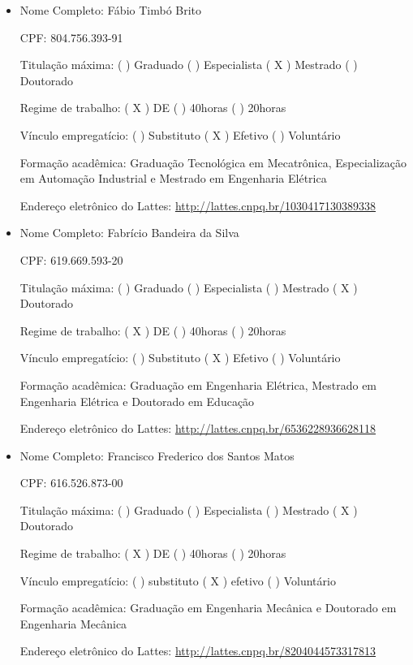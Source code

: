 \documentclass{paper}
\def\web#1{\href{#1}{#1}}
\begin{document}
\begin{itemize}
 Vínculo empregatício: (  ) Substituto (X) Efetivo  (  ) Voluntário

 Formação acadêmica: Graduação em Administração

 Endereço eletrônico do Lattes: \web{http://lattes.cnpq.br/5492252517721394}


\item Nome Completo: Fábio Timbó Brito

 CPF: 804.756.393-91

 Titulação máxima: (  ) Graduado  (  ) Especialista  ( X ) Mestrado (  ) Doutorado

 Regime de trabalho: ( X ) DE  (  ) 40horas (  ) 20horas

 Vínculo empregatício: (  ) Substituto  ( X ) Efetivo  (  ) Voluntário

 Formação acadêmica: Graduação Tecnológica em Mecatrônica, Especialização em Automação Industrial e Mestrado em
Engenharia Elétrica

 Endereço eletrônico do Lattes: \web{http://lattes.cnpq.br/1030417130389338}


\item Nome Completo: Fabrício Bandeira da Silva

 CPF: 619.669.593-20

 Titulação máxima: (  ) Graduado (  ) Especialista  (  ) Mestrado ( X ) Doutorado

 Regime de trabalho: ( X ) DE  (  ) 40horas (  ) 20horas

 Vínculo empregatício: (  ) Substituto  ( X ) Efetivo  (  ) Voluntário

 Formação acadêmica: Graduação em Engenharia Elétrica, Mestrado em Engenharia Elétrica e Doutorado em Educação

 Endereço eletrônico do Lattes: \web{http://lattes.cnpq.br/6536228936628118}


\item Nome Completo: Francisco Frederico dos Santos Matos

 CPF: 616.526.873-00

 Titulação máxima: (  ) Graduado  (  ) Especialista  (  ) Mestrado ( X ) Doutorado

 Regime de trabalho: ( X ) DE  (  ) 40horas (  ) 20horas

 Vínculo empregatício: (  ) substituto  ( X ) efetivo  (  ) Voluntário

 Formação acadêmica: Graduação em Engenharia Mecânica e Doutorado em Engenharia Mecânica

 Endereço eletrônico do Lattes: \web{http://lattes.cnpq.br/8204044573317813}


\end{itemize}
\end{document}
